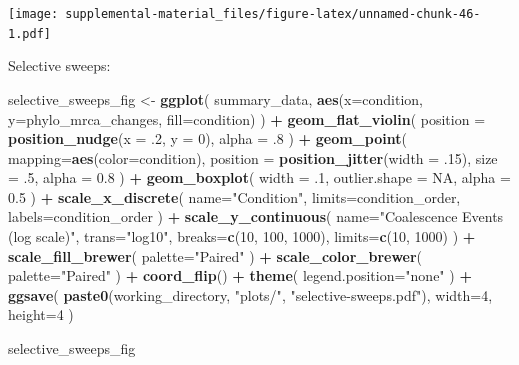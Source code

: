 \documentclass[]{book}
\newenvironment{Shaded}{\begin{snugshade}}{\end{snugshade}}
\newcommand{\DataTypeTok}[1]{\textcolor[rgb]{0.13,0.29,0.53}{#1}}
\newcommand{\DecValTok}[1]{\textcolor[rgb]{0.00,0.00,0.81}{#1}}
\newcommand{\FloatTok}[1]{\textcolor[rgb]{0.00,0.00,0.81}{#1}}
\newcommand{\KeywordTok}[1]{\textcolor[rgb]{0.13,0.29,0.53}{\textbf{#1}}}
\newcommand{\NormalTok}[1]{#1}
\newcommand{\OperatorTok}[1]{\textcolor[rgb]{0.81,0.36,0.00}{\textbf{#1}}}
\newcommand{\OtherTok}[1]{\textcolor[rgb]{0.56,0.35,0.01}{#1}}
\newcommand{\StringTok}[1]{\textcolor[rgb]{0.31,0.60,0.02}{#1}}
\begin{document}
\texttt{[image: supplemental-material\_files/figure-latex/unnamed-chunk-46-1.pdf]}

Selective sweeps:

\begin{Shaded}
\begin{Highlighting}[]
\NormalTok{selective_sweeps_fig <-}\StringTok{ }\KeywordTok{ggplot}\NormalTok{(}
\NormalTok{    summary_data,}
    \KeywordTok{aes}\NormalTok{(}\DataTypeTok{x=}\NormalTok{condition, }\DataTypeTok{y=}\NormalTok{phylo_mrca_changes, }\DataTypeTok{fill=}\NormalTok{condition)}
\NormalTok{  ) }\OperatorTok{+}
\StringTok{  }\KeywordTok{geom_flat_violin}\NormalTok{(}
    \DataTypeTok{position =} \KeywordTok{position_nudge}\NormalTok{(}\DataTypeTok{x =} \FloatTok{.2}\NormalTok{, }\DataTypeTok{y =} \DecValTok{0}\NormalTok{),}
    \DataTypeTok{alpha =} \FloatTok{.8}
\NormalTok{  ) }\OperatorTok{+}
\StringTok{  }\KeywordTok{geom_point}\NormalTok{(}
    \DataTypeTok{mapping=}\KeywordTok{aes}\NormalTok{(}\DataTypeTok{color=}\NormalTok{condition),}
    \DataTypeTok{position =} \KeywordTok{position_jitter}\NormalTok{(}\DataTypeTok{width =} \FloatTok{.15}\NormalTok{),}
    \DataTypeTok{size =} \FloatTok{.5}\NormalTok{,}
    \DataTypeTok{alpha =} \FloatTok{0.8}
\NormalTok{  ) }\OperatorTok{+}
\StringTok{  }\KeywordTok{geom_boxplot}\NormalTok{(}
    \DataTypeTok{width =} \FloatTok{.1}\NormalTok{,}
    \DataTypeTok{outlier.shape =} \OtherTok{NA}\NormalTok{,}
    \DataTypeTok{alpha =} \FloatTok{0.5}
\NormalTok{  ) }\OperatorTok{+}
\StringTok{  }\KeywordTok{scale_x_discrete}\NormalTok{(}
    \DataTypeTok{name=}\StringTok{"Condition"}\NormalTok{,}
    \DataTypeTok{limits=}\NormalTok{condition_order,}
    \DataTypeTok{labels=}\NormalTok{condition_order}
\NormalTok{  ) }\OperatorTok{+}
\StringTok{  }\KeywordTok{scale_y_continuous}\NormalTok{(}
    \DataTypeTok{name=}\StringTok{"Coalescence Events (log scale)"}\NormalTok{,}
    \DataTypeTok{trans=}\StringTok{"log10"}\NormalTok{,}
    \DataTypeTok{breaks=}\KeywordTok{c}\NormalTok{(}\DecValTok{10}\NormalTok{, }\DecValTok{100}\NormalTok{, }\DecValTok{1000}\NormalTok{),}
    \DataTypeTok{limits=}\KeywordTok{c}\NormalTok{(}\DecValTok{10}\NormalTok{, }\DecValTok{1000}\NormalTok{)}
\NormalTok{  ) }\OperatorTok{+}
\StringTok{  }\KeywordTok{scale_fill_brewer}\NormalTok{(}
    \DataTypeTok{palette=}\StringTok{"Paired"}
\NormalTok{  ) }\OperatorTok{+}
\StringTok{  }\KeywordTok{scale_color_brewer}\NormalTok{(}
    \DataTypeTok{palette=}\StringTok{"Paired"}
\NormalTok{  ) }\OperatorTok{+}
\StringTok{  }\KeywordTok{coord_flip}\NormalTok{() }\OperatorTok{+}
\StringTok{  }\KeywordTok{theme}\NormalTok{(}
    \DataTypeTok{legend.position=}\StringTok{"none"}
\NormalTok{  ) }\OperatorTok{+}
\StringTok{  }\KeywordTok{ggsave}\NormalTok{(}
    \KeywordTok{paste0}\NormalTok{(working_directory, }\StringTok{"plots/"}\NormalTok{, }\StringTok{"selective-sweeps.pdf"}\NormalTok{),}
    \DataTypeTok{width=}\DecValTok{4}\NormalTok{,}
    \DataTypeTok{height=}\DecValTok{4}
\NormalTok{  )}

\NormalTok{selective_sweeps_fig}
\end{Highlighting}
\end{Shaded}
\end{document}
